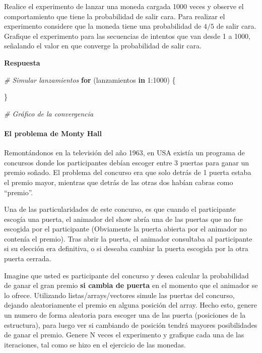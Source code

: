 \documentclass[]{article}
\newenvironment{Shaded}{\begin{snugshade}}{\end{snugshade}}
\newcommand{\CommentTok}[1]{\textcolor[rgb]{0.56,0.35,0.01}{\textit{#1}}}
\newcommand{\ControlFlowTok}[1]{\textcolor[rgb]{0.13,0.29,0.53}{\textbf{#1}}}
\newcommand{\DecValTok}[1]{\textcolor[rgb]{0.00,0.00,0.81}{#1}}
\newcommand{\NormalTok}[1]{#1}
\newcommand{\SpecialCharTok}[1]{\textcolor[rgb]{0.00,0.00,0.00}{#1}}
\let\oldparagraph\paragraph
\renewcommand{\paragraph}[1]{\oldparagraph{#1}\mbox{}}
\begin{document}
Realice el experimento de lanzar una moneda cargada 1000 veces y observe
el comportamiento que tiene la probabilidad de salir cara. Para realizar
el experimento considere que la moneda tiene una probabilidad de \(4/5\)
de salir cara. Grafique el experimento para las secuencias de intentos
que van desde 1 a 1000, señalando el valor en que converge la
probabilidad de salir cara.

\textbf{Respuesta}

\begin{Shaded}
\begin{Highlighting}[]
\CommentTok{\# Simular lanzamientos}
\ControlFlowTok{for}\NormalTok{ (lanzamientos }\ControlFlowTok{in} \DecValTok{1}\SpecialCharTok{:}\DecValTok{1000}\NormalTok{) \{}
  
\NormalTok{\}}

\CommentTok{\# Gráfico de la convergencia}
\end{Highlighting}
\end{Shaded}

\hypertarget{el-problema-de-monty-hall}{%
\paragraph{El problema de Monty Hall}\label{el-problema-de-monty-hall}}

Remontándonos en la televisión del año 1963, en USA existía un programa
de concursos donde los participantes debían escoger entre 3 puertas para
ganar un premio soñado. El problema del concurso era que solo detrás de
1 puerta estaba el premio mayor, mientras que detrás de las otras dos
habían cabras como ``premio''.

Una de las particularidades de este concurso, es que cuando el
participante escogía una puerta, el animador del show abría una de las
puertas que no fue escogida por el participante (Obviamente la puerta
abierta por el animador no contenía el premio). Tras abrir la puerta, el
animador consultaba al participante si su elección era definitiva, o si
deseaba cambiar la puerta escogida por la otra puerta cerrada.

Imagine que usted es participante del concurso y desea calcular la
probabilidad de ganar el gran premio \textbf{si cambia de puerta} en el
momento que el animador se lo ofrece. Utilizando listas/arrays/vectores
simule las puertas del concurso, dejando aleatoriamente el premio en
alguna posición del array. Hecho esto, genere un numero de forma
aleatoria para escoger una de las puerta (posiciones de la estructura),
para luego ver si cambiando de posición tendrá mayores posibilidades de
ganar el premio. Genere N veces el experimento y grafique cada una de
las iteraciones, tal como se hizo en el ejercicio de las monedas.
\end{document}
